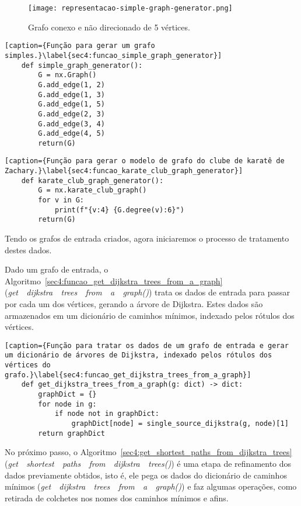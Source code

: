 \begin{figure}[!htb]
    \centering
	\texttt{[image: representacao-simple-graph-generator.png]}
    \caption{Grafo conexo e não direcionado de 5 vértices.}
    \label{sec4:representacao-simple-graph-generator}
\end{figure}

\begin{lstlisting}[caption={Função para gerar um grafo simples.}\label{sec4:funcao_simple_graph_generator}]
	def simple_graph_generator():
		G = nx.Graph()
		G.add_edge(1, 2)
		G.add_edge(1, 3)
		G.add_edge(1, 5)
		G.add_edge(2, 3)
		G.add_edge(3, 4)
		G.add_edge(4, 5)
		return(G)
\end{lstlisting}

\begin{lstlisting}[caption={Função para gerar o modelo de grafo do clube de karatê de Zachary.}\label{sec4:funcao_karate_club_graph_generator}]
	def karate_club_graph_generator():
		G = nx.karate_club_graph()
		for v in G:
			print(f"{v:4} {G.degree(v):6}")
		return(G)
\end{lstlisting}

Tendo os grafos de entrada criados, agora iniciaremos o processo de tratamento destes dados.

Dado um grafo de entrada, o Algoritmo~\ref{sec4:funcao_get_dijkstra_trees_from_a_graph} (\mbox{\emph{get~\textunderscore~dijkstra~\textunderscore~trees~\textunderscore~from~\textunderscore~a~\textunderscore~graph()}}) trata os dados de entrada para passar por cada um dos vértices, gerando a árvore de Dijkstra. Estes dados são armazenados em um dicionário de caminhos mínimos, indexado pelos rótulos dos vértices.

\begin{lstlisting}[caption={Função para tratar os dados de um grafo de entrada e gerar um dicionário de árvores de Dijkstra, indexado pelos rótulos dos vértices do grafo.}\label{sec4:funcao_get_dijkstra_trees_from_a_graph}]
	def get_dijkstra_trees_from_a_graph(g: dict) -> dict:
		graphDict = {}
		for node in g:
			if node not in graphDict:
				graphDict[node] = single_source_dijkstra(g, node)[1]
		return graphDict
\end{lstlisting}

No próximo passo, o Algoritmo~\ref{sec4:get_shortest_paths_from_dijkstra_trees} (\mbox{\emph{get~\textunderscore~shortest~\textunderscore~paths~\textunderscore~from~\textunderscore~dijkstra~\textunderscore~trees()}}) é uma etapa de refinamento dos dados previamente obtidos, isto é, ele pega os dados do dicionário de caminhos mínimos (\mbox{\emph{get~\textunderscore~dijkstra~\textunderscore~trees~\textunderscore~from~\textunderscore~a~\textunderscore~graph()}}) e faz algumas operações, como retirada de colchetes nos nomes dos caminhos mínimos e afins.

